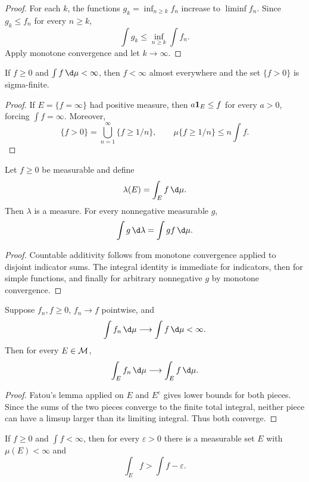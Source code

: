 \begin{proof}
For each $k$, the functions $g_k=\inf_{n\geq k}f_n$ increase to $\liminf f_n$. Since $g_k\leq f_n$ for every $n\geq k$,
\[
\int g_k\leq\inf_{n\geq k}\int f_n.
\]
Apply monotone convergence and let $k\to\infty$.
\end{proof}

\begin{prop}
If $f\geq0$ and $\int f\,\d\mu<\infty$, then $f<\infty$ almost everywhere and the set $\{f>0\}$ is sigma-finite.
\end{prop}

\begin{proof}
If $E=\{f=\infty\}$ had positive measure, then $a\mathbf{1}_E\leq f$ for every $a>0$, forcing $\int f=\infty$. Moreover,
\[
\{f>0\}=\bigcup_{n=1}^{\infty}\{f\geq1/n\},
\qquad
\mu\{f\geq1/n\}\leq n\int f.
\]
\end{proof}

\begin{prop}
Let $f\geq0$ be measurable and define
\[
\lambda(E)=\int_E f\,\d\mu.
\]
Then $\lambda$ is a measure. For every nonnegative measurable $g$,
\[
\int g\,\d\lambda=\int gf\,\d\mu.
\]
\end{prop}

\begin{proof}
Countable additivity follows from monotone convergence applied to disjoint indicator sums. The integral identity is immediate for indicators, then for simple functions, and finally for arbitrary nonnegative $g$ by monotone convergence.
\end{proof}

\begin{prop}
Suppose $f_n,f\geq0$, $f_n\to f$ pointwise, and
\[
\int f_n\,\d\mu\longrightarrow\int f\,\d\mu<\infty.
\]
Then for every $E\in\mathcal{M}$,
\[
\int_Ef_n\,\d\mu\longrightarrow\int_Ef\,\d\mu.
\]
\end{prop}

\begin{proof}
Fatou's lemma applied on $E$ and $E^c$ gives lower bounds for both pieces. Since the sums of the two pieces converge to the finite total integral, neither piece can have a limsup larger than its limiting integral. Thus both converge.
\end{proof}

\begin{prop}
If $f\geq0$ and $\int f<\infty$, then for every $\varepsilon>0$ there is a measurable set $E$ with $\mu(E)<\infty$ and
\[
\int_Ef>\int f-\varepsilon.
\]
\end{prop}

